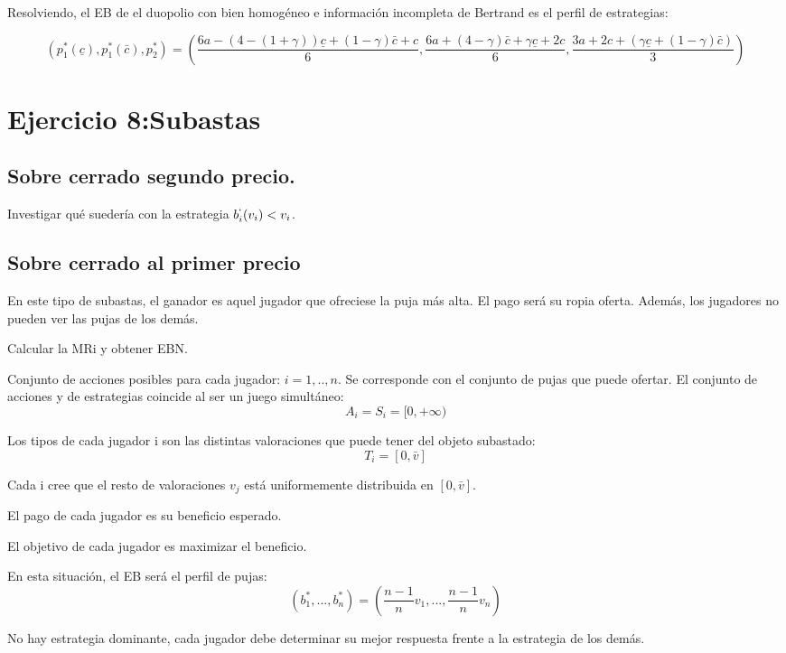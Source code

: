 \documentclass{article}
\theoremstyle{definition}
\theoremstyle{remark}
\begin{document}
\begin{Schunk}
\begin{Soutput}
Resolviendo, el EB de el duopolio con bien homog\'eneo e informaci\'on incompleta de Bertrand es el perfil de estrategias:

$${(p_1^*(\underline{c}),p_1^*(\bar{c}),p_2^*)}={(\frac{6a-(4-(1+\gamma))\underline{c}+(1-\gamma)\bar{c}+c}{6},\frac{6a+(4-\gamma)\bar{c}+\gamma \underline{c}+2c}{6},\frac{3a+2c+(\gamma \underline{c}+(1-\gamma)\bar{c})}{3})}$$









\section{Ejercicio 8:Subastas}
\subsection{Sobre cerrado segundo precio.}
Investigar qu\'e sueder\'ia con la estrategia $b_i^`(v_i)<v_i$.
\subsection{Sobre cerrado al primer precio}

En este tipo de subastas, el ganador es aquel jugador que ofreciese la puja m\'as alta. El pago ser\'a su ropia oferta. Adem\'as, los jugadores no pueden ver las pujas de los dem\'as.

Calcular la MRi y obtener EBN.

Conjunto de acciones posibles para cada jugador: $i=1,..,n$. Se corresponde con el conjunto de pujas que puede ofertar.
El conjunto de acciones y de estrategias coincide al ser un juego simult\'aneo:
$$A_i=S_i=[0,+\infty)$$

Los tipos de cada jugador i son las distintas valoraciones que puede tener del objeto subastado:
$$T_i=[0,\bar{v}]$$

Cada i cree que el resto de valoraciones $v_j$ está uniformemente distribuida en $[0,\bar{v}]$.

El pago de cada jugador es su beneficio esperado.

El objetivo de cada jugador es maximizar el beneficio.

En esta situaci\'on, el EB ser\'a el perfil de pujas:
$${(b_1^*,...,b_n^*)}={(\frac{n-1}{n}v_1,...,\frac{n-1}{n}v_n)}$$

No hay estrategia dominante, cada jugador debe determinar su mejor respuesta frente a la estrategia de los dem\'as.


\end{Soutput}
\end{Schunk}
\end{document}
